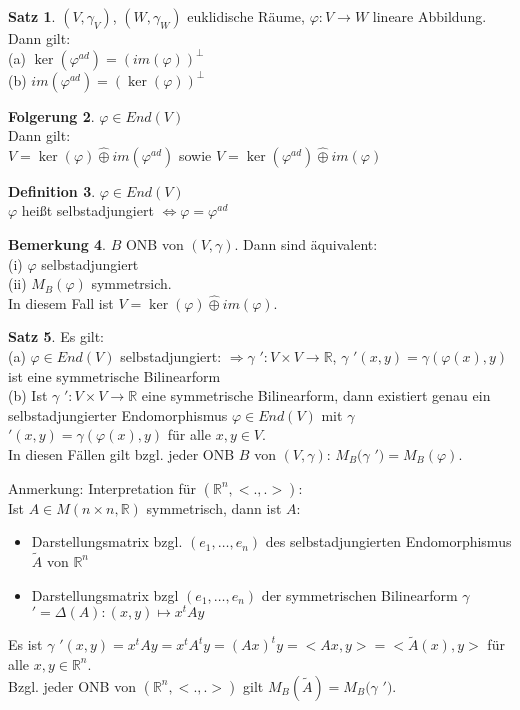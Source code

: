 \documentclass[10pt,a4paper,numbers=endperiod]{scrartcl}
\theoremstyle{definition}
\newtheorem{satz}{Satz}[section]
\newtheorem{defi}[satz]{Definition}
\newtheorem{bem}[satz]{Bemerkung}
\newtheorem{folg}[satz]{Folgerung}
\def\RR{{\mathbb R}}
\begin{document}
\begin{satz}
	$(V, \gamma_V)$, $(W,\gamma_W)$ euklidische Räume, $\varphi: V \rightarrow W$ lineare Abbildung. Dann gilt:\\
	(a) $\ker (\varphi^{ad}) = (im (\varphi))^\perp$\\
	(b) $im (\varphi^{ad}) = (\ker(\varphi))^\perp$
\end{satz}

\begin{folg}
	$\varphi \in End(V)$\\
	Dann gilt:\\
	$V = \ker (\varphi) \hat{\oplus} im(\varphi^{ad})$ sowie $V = \ker (\varphi^{ad}) \hat{\oplus} im(\varphi)$
\end{folg}

\begin{defi}
	$\varphi \in End (V)$\\
	$\varphi$ heißt selbstadjungiert $\Leftrightarrow \varphi = \varphi^{ad}$
\end{defi}

\begin{bem}
	$B$ ONB von $(V, \gamma)$. Dann sind äquivalent:\\
	(i) $\varphi$ selbstadjungiert\\
	(ii) $M_B(\varphi)$ symmetrsich.\\
	In diesem Fall ist $V = \ker (\varphi) \hat{\oplus} im (\varphi)$.
\end{bem}

\begin{satz}
	Es gilt:\\
	(a) $\varphi \in End(V)$ selbstadjungiert: $\Rightarrow \gamma$ $' : V \times V \rightarrow \RR$, $\gamma$ $' (x,y) = \gamma(\varphi(x), y)$ ist eine symmetrische Bilinearform\\
	(b) Ist $\gamma$ $': V \times V \rightarrow \RR$ eine symmetrische Bilinearform, dann existiert genau ein selbstadjungierter Endomorphismus $\varphi \in End(V)$ mit $\gamma$ $'(x,y) = \gamma(\varphi(x), y)$ für alle $x,y \in V$.\\
	In diesen Fällen gilt bzgl. jeder ONB $B$ von $(V, \gamma)$: $M_B(\gamma$ $') = M_B(\varphi)$.
\end{satz}

Anmerkung: Interpretation für $(\RR^n, <.,.>):$\\
Ist $A \in M(n \times n, \RR)$ symmetrisch, dann ist $A$:
\begin{itemize}
	\item Darstellungsmatrix bzgl. $(e_1, \ldots, e_n)$ des selbstadjungierten Endomorphismus $\tilde{A}$ von $\RR^n$
	\item Darstellungsmatrix bzgl $(e_1, \ldots, e_n)$ der symmetrischen Bilinearform $\gamma$ $' = \varDelta(A) : (x,y) \mapsto x^tAy$
\end{itemize}
Es ist $\gamma$ $'(x,y) = x^tAy = x^tA^ty = (Ax)^ty = <Ax,y> = <\tilde{A}(x), y>$ für alle $x,y \in \RR^n$.\\
Bzgl. jeder ONB von $(\RR^n, <.,.>)$ gilt $M_B(\tilde{A}) = M_B(\gamma$ $')$.
\end{document}
